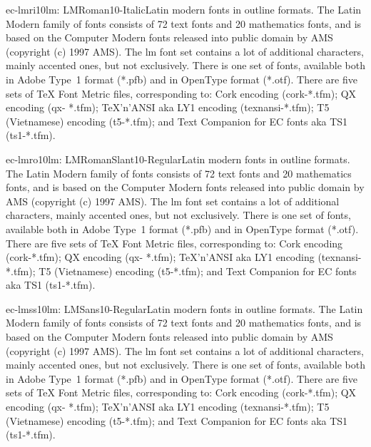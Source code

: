 \documentclass{ddltxtyp}
\begin{document}
\begin{package}{ec-lmri10}{lm: LMRoman10-Italic}{Latin modern fonts in outline formats.}
The Latin Modern family of fonts consists of 72 text fonts and
20 mathematics fonts, and is based on the Computer Modern fonts
released into public domain by AMS (copyright (c) 1997 AMS).
The lm font set contains a lot of additional characters, mainly
accented ones, but not exclusively. There is one set of fonts,
available both in Adobe Type~1 format (*.pfb) and in OpenType
format (*.otf). There are five sets of {\TeX} Font Metric files,
corresponding to: Cork encoding (cork-*.tfm); QX encoding (qx-
*.tfm); {\TeX}'n'ANSI aka LY1 encoding (texnansi-*.tfm); T5
(Vietnamese) encoding (t5-*.tfm); and Text Companion for EC
fonts aka TS1 (ts1-*.tfm).
\end{package}
\begin{package}{ec-lmro10}{lm: LMRomanSlant10-Regular}{Latin modern fonts in outline formats.}
The Latin Modern family of fonts consists of 72 text fonts and
20 mathematics fonts, and is based on the Computer Modern fonts
released into public domain by AMS (copyright (c) 1997 AMS).
The lm font set contains a lot of additional characters, mainly
accented ones, but not exclusively. There is one set of fonts,
available both in Adobe Type~1 format (*.pfb) and in OpenType
format (*.otf). There are five sets of {\TeX} Font Metric files,
corresponding to: Cork encoding (cork-*.tfm); QX encoding (qx-
*.tfm); {\TeX}'n'ANSI aka LY1 encoding (texnansi-*.tfm); T5
(Vietnamese) encoding (t5-*.tfm); and Text Companion for EC
fonts aka TS1 (ts1-*.tfm).
\end{package}
\begin{package}{ec-lmss10}{lm: LMSans10-Regular}{Latin modern fonts in outline formats.}
The Latin Modern family of fonts consists of 72 text fonts and
20 mathematics fonts, and is based on the Computer Modern fonts
released into public domain by AMS (copyright (c) 1997 AMS).
The lm font set contains a lot of additional characters, mainly
accented ones, but not exclusively. There is one set of fonts,
available both in Adobe Type~1 format (*.pfb) and in OpenType
format (*.otf). There are five sets of {\TeX} Font Metric files,
corresponding to: Cork encoding (cork-*.tfm); QX encoding (qx-
*.tfm); {\TeX}'n'ANSI aka LY1 encoding (texnansi-*.tfm); T5
(Vietnamese) encoding (t5-*.tfm); and Text Companion for EC
fonts aka TS1 (ts1-*.tfm).
\end{package}
\end{document}
